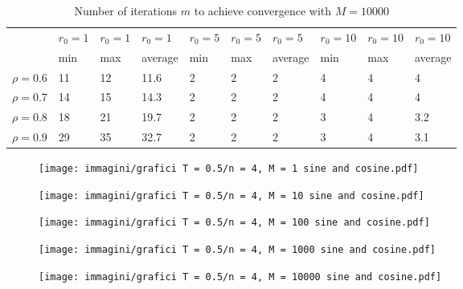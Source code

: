 \documentclass[a4paper,11pt,openright]{report}
\begin{document}
\begin{table}[H]
\centering
\addtolength{\leftskip}{-1.5cm}
\addtolength{\rightskip}{-1.5cm}
\begin{tabular}{|c|lllllllll|}
\hline
$ $ & $r_0 = 1$ & $r_0 = 1$ & $r_0 = 1$ & $r_0 = 5$ & $r_0 = 5$ & $r_0 = 5$ & $r_0 = 10$ & $r_0 = 10$ & $r_0 = 10$  \\
$ $ & min & max & average & min & max & average & min & max & average \\ 
\hline
$\rho = 0.6$ & 11 & 12 & 11.6 & 2 & 2 & 2 & 4 & 4 & 4\\

$\rho = 0.7$ & 14 & 15 & 14.3 & 2 & 2 & 2 & 4 & 4 & 4\\

$\rho = 0.8$ & 18 & 21 & 19.7 & 2 & 2 & 2 & 3 & 4 & 3.2\\

$\rho = 0.9$ & 29 & 35 & 32.7 & 2 & 2 & 2 & 3 & 4 & 3.1\\
\hline
\end{tabular}
\caption{Number of iterations $m$ to achieve convergence with $M = 10000$}
\end{table}
\begin{figure}[H]
\centering
\texttt{[image: immagini/grafici T = 0.5/n = 4, M = 1 sine and cosine.pdf]}
\end{figure}
\begin{figure}[H]
\centering
\texttt{[image: immagini/grafici T = 0.5/n = 4, M = 10 sine and cosine.pdf]}
\end{figure}
\begin{figure}[H]
\centering
\texttt{[image: immagini/grafici T = 0.5/n = 4, M = 100 sine and cosine.pdf]}
\end{figure}
\begin{figure}[H]
\centering
\texttt{[image: immagini/grafici T = 0.5/n = 4, M = 1000 sine and cosine.pdf]}
\end{figure}
\begin{figure}[H]
\centering
\texttt{[image: immagini/grafici T = 0.5/n = 4, M = 10000 sine and cosine.pdf]}
\end{figure}
\newpage
\end{document}

